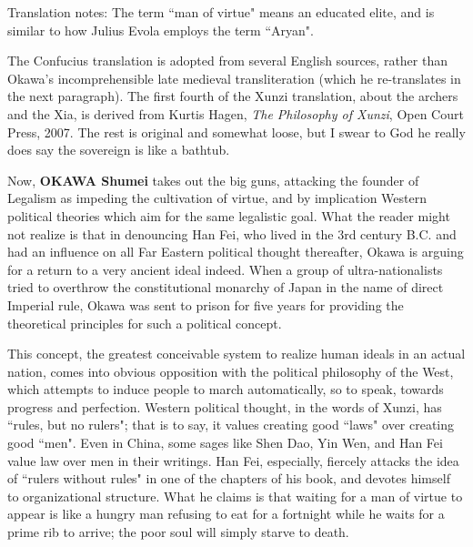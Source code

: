 \begin{quotex}
Translation notes: The term ``man of virtue" means an educated elite, and is similar to how Julius Evola employs the term ``Aryan".

The Confucius translation is adopted from several English sources, rather than Okawa's incomprehensible late medieval transliteration (which he re-translates in the next paragraph). The first fourth of the Xunzi translation, about the archers and the Xia, is derived from Kurtis Hagen, \emph{The Philosophy of Xunzi}, Open Court Press, 2007. The rest is original and somewhat loose, but I swear to God he really does say the sovereign is like a bathtub.

\end{quotex}

\hfill

\begin{quotex}
Now, \textbf{OKAWA Shumei} takes out the big guns, attacking the founder of Legalism as impeding the cultivation of virtue, and by implication Western political theories which aim for the same legalistic goal. What the reader might not realize is that in denouncing Han Fei, who lived in the 3rd century B.C. and had an influence on all Far Eastern political thought thereafter, Okawa is arguing for a return to a very ancient ideal indeed. When a group of ultra-nationalists tried to overthrow the constitutional monarchy of Japan in the name of direct Imperial rule, Okawa was sent to prison for five years for providing the theoretical principles for such a political concept.

\end{quotex}

This concept, the greatest conceivable system to realize human ideals in an actual nation, comes into obvious opposition with the political philosophy of the West, which attempts to induce people to march automatically, so to speak, towards progress and perfection. Western political thought, in the words of Xunzi, has ``rules, but no rulers"; that is to say, it values creating good ``laws" over creating good ``men". Even in China, some sages like Shen Dao, Yin Wen, and Han Fei value law over men in their writings. Han Fei, especially, fiercely attacks the idea of ``rulers without rules" in one of the chapters of his book, and devotes himself to organizational structure. What he claims is that waiting for a man of virtue to appear is like a hungry man refusing to eat for a fortnight while he waits for a prime rib to arrive; the poor soul will simply starve to death.

